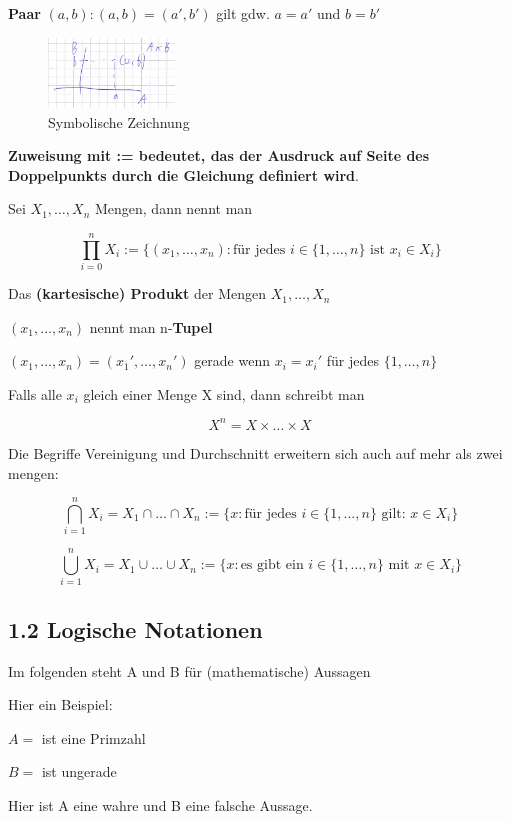 \documentclass{scrartcl}
\newcommand{\qq}[1]{\glqq #1\grqq}
\begin{document}
\textbf{Paar} $(a,b): (a,b) = (a',b')$ gilt gdw. $a=a'$ und $b=b'$

\begin{figure}[h!]
  \centering
    \includegraphics[width=0.3\textwidth]{img/1/3}
  \caption{Symbolische Zeichnung}
\end{figure}

\textbf{Zuweisung mit \qq{:=} bedeutet, das der Ausdruck auf Seite des Doppelpunkts durch die Gleichung definiert wird}.

Sei $X_1,\ldots,X_n$ Mengen, dann nennt man

\[\prod_{i=0}^n X_i := \{(x_1,\ldots,x_n):\text{für jedes } i \in \{1,\ldots,n\} \text{ ist } x_i \in X_i\}\]

Das \textbf{(kartesische) Produkt} der Mengen $X_1,\ldots,X_n$

$(x_1,\ldots,x_n)$ nennt man n-\textbf{Tupel}

$(x_1,\ldots,x_n)=(x_1',\ldots,x_n')$ gerade wenn $x_i=x_i'$ für jedes $\{1,\ldots,n\} $

Falls alle $x_i$ gleich einer Menge X sind, dann schreibt man

\[X^n = X \times \ldots \times X\] 

Die Begriffe Vereinigung und Durchschnitt erweitern sich auch auf mehr als zwei mengen:

\[\bigcap_{i=1}^n X_i = X_1 \cap \ldots \cap X_n := \{x : \text{für jedes }i \in \{1,\ldots,n\} \text{ gilt: } x \in X_i \}\]

\[\bigcup_{i=1}^n X_i = X_1 \cup \ldots \cup X_n := \{x : \text{es gibt ein }i \in \{1,\ldots,n\} \text{ mit } x \in X_i \}\]

\subsection{1.2 Logische Notationen}

Im folgenden steht A und B für (mathematische) Aussagen

Hier ein Beispiel:

$A=$ \qq{3 ist eine Primzahl}

$B=$ \qq{4 ist ungerade}

Hier ist A eine wahre und B eine falsche Aussage.
\end{document}
